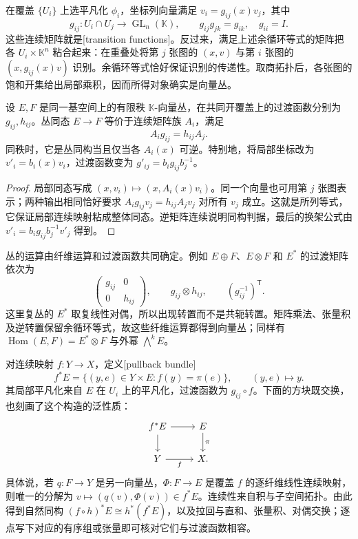 \ProseParagraphBreak

在覆盖 \(\{U_i\}\) 上选平凡化 \(\phi_i\)，坐标列向量满足 \(v_i=g_{ij}(x)v_j\)，其中
\[
	g_{ij}:U_i\cap U_j\longrightarrow\operatorname{GL}_n(\mathbb K),
	\qquad g_{ij}g_{jk}=g_{ik},\quad g_{ii}=I.
\]
这些连续矩阵就是[transition functions]。反过来，满足上述余循环等式的矩阵把各 \(U_i\times\mathbb K^n\) 粘合起来：在重叠处将第 \(j\) 张图的 \((x,v)\) 与第 \(i\) 张图的 \((x,g_{ij}(x)v)\) 识别。余循环等式恰好保证识别的传递性。取商拓扑后，各张图的饱和开集给出局部乘积，因而所得对象确实是向量丛。

\begin{proposition}\label{g2:prop:bundle-transition-isomorphism}
	设 \(E,F\) 是同一基空间上的有限秩 \(\mathbb K\)-向量丛，在共同开覆盖上的过渡函数分别为 \(g_{ij},h_{ij}\)。丛同态 \(E\to F\) 等价于连续矩阵族 \(A_i\)，满足
	\[
		A_i g_{ij}=h_{ij}A_j.
	\]
	同秩时，它是丛同构当且仅当各 \(A_i(x)\) 可逆。特别地，将局部坐标改为 \(v'_i=b_i(x)v_i\)，过渡函数变为 \(g'_{ij}=b_i g_{ij}b_j^{-1}\)。
\end{proposition}
\begin{proof}
	局部同态写成 \((x,v_i)\mapsto(x,A_i(x)v_i)\)。同一个向量也可用第 \(j\) 张图表示；两种输出相同恰好要求 \(A_ig_{ij}v_j=h_{ij}A_jv_j\) 对所有 \(v_j\) 成立。这就是所列等式，它保证局部连续映射粘成整体同态。逆矩阵连续说明同构判据，最后的换架公式由 \(v'_i=b_ig_{ij}b_j^{-1}v'_j\) 得到。
\end{proof}

丛的运算由纤维运算和过渡函数共同确定。例如 \(E\oplus F\)、\(E\otimes F\) 和 \(E^*\) 的过渡矩阵依次为
\[
	\begin{pmatrix}g_{ij}&0\\0&h_{ij}\end{pmatrix},
	\qquad g_{ij}\otimes h_{ij},
	\qquad(g_{ij}^{-1})^{\mathsf T}.
\]
这里复丛的 \(E^*\) 取复线性对偶，所以出现转置而不是共轭转置。矩阵乘法、张量积及逆转置保留余循环等式，故这些纤维运算都得到向量丛；同样有 \(\operatorname{Hom}(E,F)=E^*\otimes F\) 与外幂 \(\bigwedge^kE\)。

\ProseParagraphBreak

对连续映射 \(f:Y\to X\)，定义[pullback bundle]
\[
	f^*E=\{(y,e)\in Y\times E:f(y)=\pi(e)\},\qquad (y,e)\longmapsto y.
\]
其局部平凡化来自 \(E\) 在 \(U_i\) 上的平凡化，过渡函数为 \(g_{ij}\circ f\)。下面的方块既交换，也刻画了这个构造的泛性质：
\[
	\begin{tikzcd}
		f^*E\arrow[r]\arrow[d]&E\arrow[d,"\pi"]\\
		Y\arrow[r,"f"']&X.
	\end{tikzcd}
\]
具体说，若 \(q:F\to Y\) 是另一向量丛，\(\Phi:F\to E\) 是覆盖 \(f\) 的逐纤维线性连续映射，则唯一的分解为 \(v\mapsto(q(v),\Phi(v))\in f^*E\)。连续性来自积与子空间拓扑。由此得到自然同构 \((f\circ h)^*E\cong h^*(f^*E)\)，以及拉回与直和、张量积、对偶交换；逐点写下对应的有序组或张量即可核对它们与过渡函数相容。

